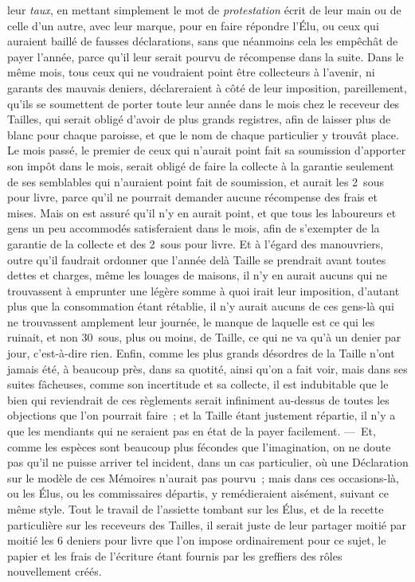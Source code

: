 \documentclass[french,twoside]{book} %
\begin{document}
leur {\itshape taux}, en mettant simplement le mot de {\itshape protestation} écrit de leur main ou de celle d’un autre, avec leur marque, pour en faire répondre l’Élu, ou ceux qui auraient baillé de fausses déclarations, sans que néanmoins cela les empêchât de payer l’année, parce qu’il leur serait pourvu de récompense dans la suite. Dans le même mois, tous ceux qui ne voudraient point être collecteurs à l’avenir, ni garants des mauvais deniers, déclareraient à côté de leur imposition, pareillement, qu’ils se soumettent de porter toute leur année dans le mois chez le receveur des Tailles, qui serait obligé d’avoir de plus grands registres, afin de laisser plus de blanc pour chaque paroisse, et que le nom de chaque particulier y trouvât place. Le mois passé, le premier de ceux qui n’aurait point fait sa soumission d’apporter son impôt dans le mois, serait obligé de faire la collecte à la garantie seulement de ses semblables qui n’auraient point fait de soumission, et aurait les 2 sous pour livre, parce qu’il ne pourrait demander aucune récompense des frais et mises. Mais on est assuré qu’il n’y en aurait point, et que tous les laboureurs et gens un peu accommodés satisferaient dans le mois, afin de s’exempter de la garantie de la collecte et des 2 sous pour livre. Et à l’égard des manouvriers, outre qu’il faudrait ordonner que l’année delà Taille se prendrait avant toutes dettes et charges, même les louages de maisons, il n’y en aurait aucuns qui ne trouvassent à emprunter une légère somme à quoi irait leur imposition, d’autant plus que la consommation étant rétablie, il n’y aurait aucuns de ces gens-là qui ne trouvassent amplement leur journée, le manque de laquelle est ce qui les ruinait, et non 30 sous, plus ou moins, de Taille, ce qui ne va qu’à un denier par jour, c’est-à-dire rien. Enfin, comme les plus grands désordres de la Taille n’ont jamais été, à beaucoup près, dans sa quotité, ainsi qu’on a fait voir, mais dans ses suites fâcheuses, comme son incertitude et sa collecte, il est indubitable que le bien qui reviendrait de ces règlements serait infiniment au-dessus de toutes les objections que l’on pourrait faire ; et la Taille étant justement répartie, il n’y a que les mendiants qui ne seraient pas en état de la payer facilement. — Et, comme les espèces sont beaucoup plus fécondes que l’imagination, on ne doute pas qu’il ne puisse arriver tel incident, dans un cas particulier, où une Déclaration sur le modèle de ces Mémoires n’aurait pas pourvu ; mais dans ces occasions-là, ou les Élus, ou les commissaires départis, y remédieraient aisément, suivant ce même style. Tout le travail de l’assiette tombant sur les Élus, et de la recette particulière sur les receveurs des Tailles, il serait juste de leur partager moitié par moitié les 6 deniers pour livre que l’on impose ordinairement pour ce sujet, le papier et les frais de l’écriture étant fournis par les greffiers des rôles nouvellement créés.\par
\end{document}
